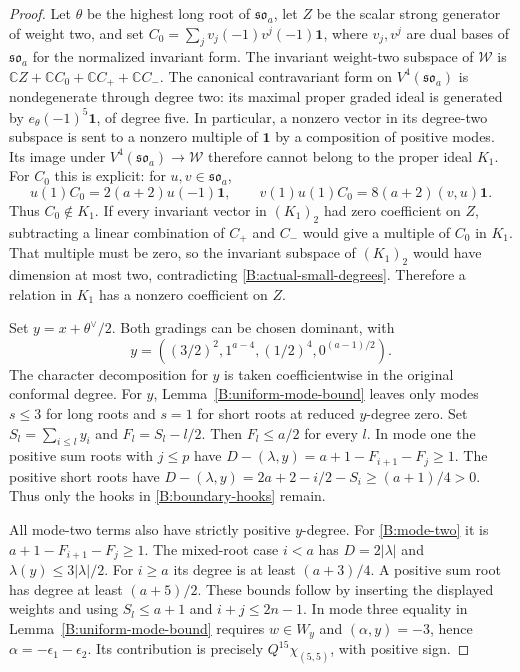 \documentclass[11pt,a4paper]{amsart}
\numberwithin{equation}{section}
\theoremstyle{definition}
\theoremstyle{remark}
\newcommand{\C}{\mathbb C}
\begin{document}
\begin{proof}
Let $\theta$ be the highest long root of $\mathfrak{so}_a$,
let $Z$ be the scalar strong generator of weight two, and set
$C_0=\sum_jv_j(-1)v^j(-1)\mathbf1$, where $v_j,v^j$ are dual
bases of $\mathfrak{so}_a$ for the normalized invariant form.
The invariant weight-two subspace of $\mathcal W$ is
$\C Z+\C C_0+\C C_++\C C_-$.
The canonical contravariant form on $V^4(\mathfrak{so}_a)$ is
nondegenerate through degree two: its maximal proper graded ideal is
generated by $e_\theta(-1)^5\mathbf1$, of degree five.
In particular, a nonzero vector in its degree-two subspace is sent
to a nonzero multiple of $\mathbf1$ by a composition of positive
modes. Its image under $V^4(\mathfrak{so}_a)\to\mathcal W$
therefore cannot belong to the proper ideal $K_1$.
For $C_0$ this is explicit: for $u,v\in\mathfrak{so}_a$,
$$
 u(1)C_0=2(a+2)u(-1)\mathbf1,
 \qquad
 v(1)u(1)C_0=8(a+2)(v,u)\mathbf1.
$$
Thus $C_0\notin K_1$. If every invariant vector in $(K_1)_2$
had zero coefficient on $Z$, subtracting a linear combination of
$C_+$ and $C_-$ would give a multiple of $C_0$ in $K_1$.
That multiple must be zero, so the invariant subspace of $(K_1)_2$
would have dimension at most two, contradicting
\eqref{B:actual-small-degrees}. Therefore a relation in $K_1$
has a nonzero coefficient on $Z$.

\medskip
Set $y=x+\theta^\vee/2$. Both gradings can be chosen dominant, with
$$
 y=((3/2)^2,1^{a-4},(1/2)^4,0^{(a-1)/2}).
$$
The character decomposition for $y$ is taken coefficientwise in the
original conformal degree. For $y$, Lemma~\ref{B:uniform-mode-bound} leaves only modes
$s\leq3$ for long roots and $s=1$ for short roots at reduced
$y$-degree zero. Set $S_l=\sum_{i\leq l}y_i$ and
$F_l=S_l-l/2$. Then $F_l\leq a/2$ for every $l$.
In mode one the positive sum roots with $j\leq p$ have
$D-(\lambda,y)=a+1-F_{i+1}-F_j\geq1$.
The positive short roots have
$D-(\lambda,y)=2a+2-i/2-S_i\geq(a+1)/4>0$.
Thus only the hooks in \eqref{B:boundary-hooks} remain.

All mode-two terms also have strictly positive $y$-degree.
For \eqref{B:mode-two} it is
$a+1-F_{i+1}-F_j\geq1$. The mixed-root case $i<a$ has
$D=2|\lambda|$ and $\lambda(y)\leq3|\lambda|/2$.
For $i\geq a$ its degree is at least $(a+3)/4$. A positive sum
root has degree at least $(a+5)/2$. These bounds follow by inserting
the displayed weights and using $S_l\leq a+1$ and $i+j\leq2n-1$.
In mode three equality in Lemma~\ref{B:uniform-mode-bound} requires
$w\in W_y$ and $(\alpha,y)=-3$, hence
$\alpha=-\epsilon_1-\epsilon_2$. Its contribution is precisely
$Q^{15}\chi_{(5,5)}$, with positive sign.


\end{proof}
\end{document}
